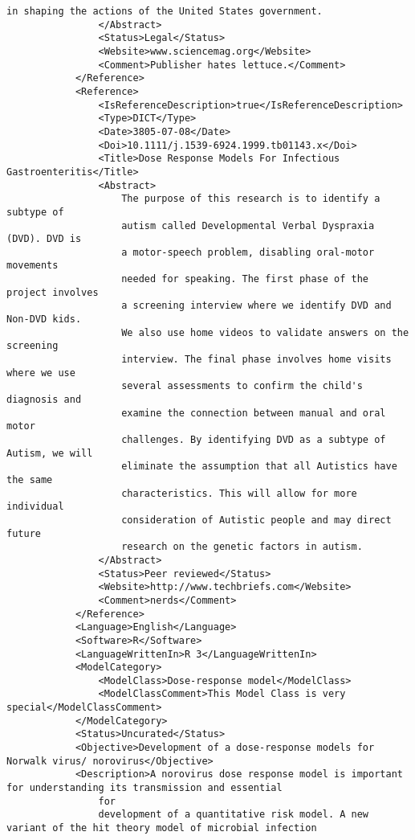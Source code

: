 \begin{lstlisting}[language=RAKIP, caption={Example of DoseResponseModel}]
                    in shaping the actions of the United States government.
                </Abstract>
                <Status>Legal</Status>
                <Website>www.sciencemag.org</Website>
                <Comment>Publisher hates lettuce.</Comment>
            </Reference>
            <Reference>
                <IsReferenceDescription>true</IsReferenceDescription>
                <Type>DICT</Type>
                <Date>3805-07-08</Date>
                <Doi>10.1111/j.1539-6924.1999.tb01143.x</Doi>
                <Title>Dose Response Models For Infectious Gastroenteritis</Title>
                <Abstract>
                    The purpose of this research is to identify a subtype of
                    autism called Developmental Verbal Dyspraxia (DVD). DVD is
                    a motor-speech problem, disabling oral-motor movements
                    needed for speaking. The first phase of the project involves
                    a screening interview where we identify DVD and Non-DVD kids.
                    We also use home videos to validate answers on the screening
                    interview. The final phase involves home visits where we use
                    several assessments to confirm the child's diagnosis and
                    examine the connection between manual and oral motor
                    challenges. By identifying DVD as a subtype of Autism, we will
                    eliminate the assumption that all Autistics have the same
                    characteristics. This will allow for more individual
                    consideration of Autistic people and may direct future
                    research on the genetic factors in autism.
                </Abstract>
                <Status>Peer reviewed</Status>
                <Website>http://www.techbriefs.com</Website>
                <Comment>nerds</Comment>
            </Reference>
            <Language>English</Language>
            <Software>R</Software>
            <LanguageWrittenIn>R 3</LanguageWrittenIn>
            <ModelCategory>
                <ModelClass>Dose-response model</ModelClass>
                <ModelClassComment>This Model Class is very special</ModelClassComment>
            </ModelCategory>
            <Status>Uncurated</Status>
            <Objective>Development of a dose-response models for Norwalk virus/ norovirus</Objective>
            <Description>A norovirus dose response model is important for understanding its transmission and essential
                for
                development of a quantitative risk model. A new variant of the hit theory model of microbial infection

\end{lstlisting}
